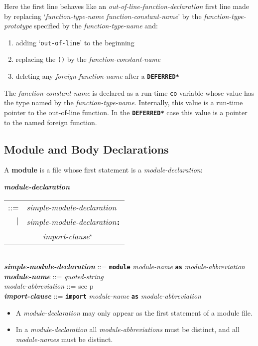 \documentclass[12pt]{article}
\newcommand{\TT}[1]{{\tt \bfseries #1}}
\newcommand{\STAR}{{\Large $^\star$}}
\newcommand{\key}[1]{{\rm \bfseries #1}}
\newcommand{\ttkey}[1]{{\tt \bfseries #1}}
\newcommand{\emkey}[1]{{\em \bfseries #1}}
\newcommand{\pagref}[1]{p\pageref{#1}}
\newenvironment{indpar}[1][0.3in]%
	{\begin{list}{}%
		     {\setlength{\itemsep}{0in}%
		      \setlength{\topsep}{0in}%
		      \setlength{\parsep}{1ex}%
		      \setlength{\labelwidth}{#1}%
		      \setlength{\leftmargin}{#1}%
		      \addtolength{\leftmargin}{\labelsep}}%
	 \item}%
	{\end{list}}
\begin{document}
Here the first line behaves like an {\em out-of-line-function-declaration}
first line made by replacing
`{\em function-type-name} {\em function-constant-name}'
by the {\em function-type-prototype} specified by the
{\em function-type-name} and:
\begin{enumerate}
\item adding `{\tt out-of-line}' to the beginning
\item
replacing the {\tt ()} by the {\em function-constant-name}
\item
deleting any {\em foreign-function-name} after a \TT{*DEFERRED*}
\end{enumerate}


The {\em function-constant-name} is declared as a run-time {\tt co}
variable whose
value has the type named by the {\em function-type-name}.
Internally, this value is a run-time pointer to the out-of-line function.
In the \TT{*DEFERRED*} case this value is a pointer to the named
foreign function.



\subsection{Module and Body Declarations}
\label{MODULE-AND-BODY-DECLARATIONS}

A \key{module} is a file whose first statement is a {\em module-declaration}:

\begin{indpar}
\emkey{module-declaration}\label{MODULE-DECLARATION}
    \begin{tabular}[t]{rl}
    ::= & {\em simple-module-declaration} \\
    $|$ & {\em simple-module-declaration}\TT{:} \\
	& \TT{~~~~}{\em import-clause}\STAR{} \\
    \end{tabular} \\
\emkey{simple-module-declaration} ::= \TT{module} {\em module-name}
        \TT{as} {\em module-abbreviation} \\
\emkey{module-name}\label{MODULE-NAME} ::= {\em quoted-string} \\
{\em module-abbreviation} ::= see \pagref{MODULE-ABBREVIATION} \\
\emkey{import-clause}\label{IMPORT-CLAUSE}
    ::= \ttkey{import} {\em module-name} \TT{as} {\em module-abbreviation}

\begin{itemize}

\item
A {\em module-declaration} may only appear as the first statement
of a module file.

\item
In a {\em module-declaration} all {\em module-abbreviations} must be
distinct, and all {\em module-names} must be distinct.
\end{itemize}
\end{indpar}
\end{document}
